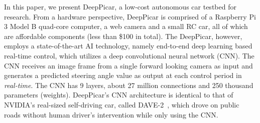 

In this paper, we present DeepPicar, a low-cost autonomous car
testbed for research. From a hardware perspective,
DeepPicar is comprised of a Raspberry Pi 3 Model B quad-core
computer, a web camera and a small RC car, all of which are affordable
components (less than \$100 in total).
The DeepPicar, however, employs a state-of-the-art AI
technology, namely end-to-end deep learning based real-time control,
which utilizes a deep convolutional neural network (CNN).
The CNN receives an image frame from a single forward
looking camera as input and generates a predicted steering angle
value as output at each control period in \emph{real-time}.
The CNN has 9 layers, about 27 million connections
and 250 thousand parameters (weights).
DeepPicar's CNN architecture is identical to that of NVIDIA's
real-sized self-driving car, called DAVE-2~\cite{Bojarski2016}, which
drove on public roads without human driver's intervention while only
using the CNN.



